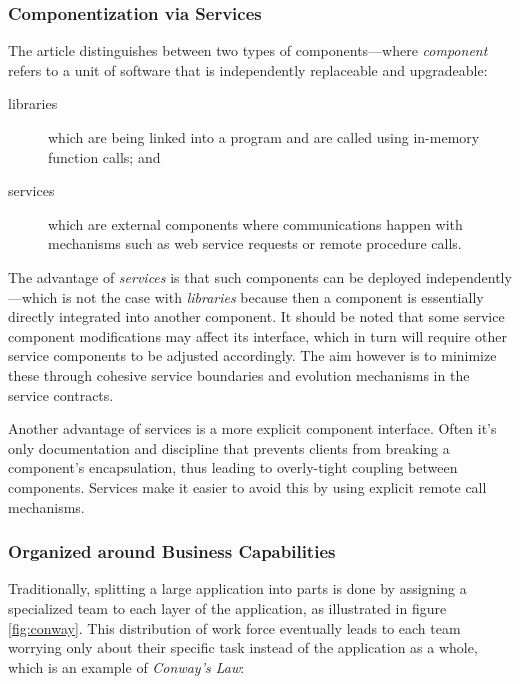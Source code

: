 \subsubsection{Componentization via Services}
\label{sec:componentization}

The article \cite{ms-definition} distinguishes between two types of
components---where \textit{component} refers to a unit of software
that is independently replaceable and upgradeable:

\begin{description}
	\item[libraries] which are being linked into a program and are
		called using in-memory function calls; and
	\item[services] which are external components where communications
		happen with mechanisms such as web service requests or remote
		procedure calls.
\end{description}

The advantage of \textit{services} is that such components can be
deployed independently---which is not the case with \textit{libraries}
because then a component is essentially directly integrated into
another component. It should be noted that some service component
modifications may affect its interface, which in turn will require
other service components to be adjusted accordingly. The aim however
is to minimize these through cohesive service boundaries and evolution
mechanisms in the service contracts.

Another advantage of services is a more explicit component interface.
Often it's only documentation and discipline that prevents clients
from breaking a component's encapsulation, thus leading to
overly-tight coupling between components. Services make it easier to
avoid this by using explicit remote call mechanisms.

\subsubsection{Organized around Business Capabilities}
\label{sec:business-capabilities}

Traditionally, splitting a large application into parts is done by
assigning a specialized team to each layer of the application, as
illustrated in figure \ref{fig:conway}. This distribution of work force
eventually leads to each team worrying only about their specific task
instead of the application as a whole, which is an example of
\textit{Conway's Law}:  

